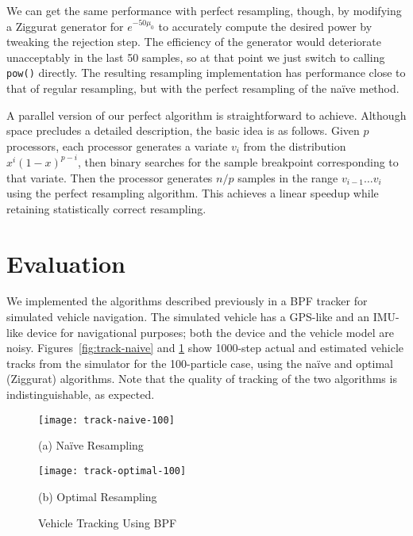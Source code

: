 \documentclass{article}
\begin{document}
  We can get the same performance with perfect resampling,
  though, by modifying a Ziggurat generator for
  $e^{-50\mu_0}$ to accurately compute the desired power by
  tweaking the rejection step.  The efficiency of the
  generator would deteriorate unacceptably in the last 50
  samples, so at that point we just switch to calling {\tt
  pow()} directly.  The resulting resampling implementation
  has performance close to that of regular resampling, but
  with the perfect resampling of the na\"ive method.

  A parallel version of our perfect algorithm is
  straightforward to achieve. Although space precludes a
  detailed description, the basic idea is as follows.  Given
  $p$ processors, each processor generates a variate $v_i$ from the
  distribution $x^i(1-x)^{p-i}$, then binary searches for
  the sample breakpoint corresponding to that variate.  Then
  the processor generates $n/p$ samples in the range
  $v_{i-1}\ldots v_i$ using the perfect resampling
  algorithm.  This achieves a linear speedup while retaining
  statistically correct resampling.

\section{Evaluation}

  We implemented the algorithms described previously in a
  BPF tracker for simulated vehicle navigation.  The
  simulated vehicle has a GPS-like and an IMU-like device
  for navigational purposes; both the device and the vehicle
  model are noisy.  Figures~\ref{fig:track-naive} and
  \ref{fig:track-optimal} show 1000-step actual and estimated vehicle
  tracks from the simulator for the 100-particle case, using
  the na\"ive and optimal (Ziggurat) algorithms.  Note
  that the quality of tracking of the two algorithms is
  indistinguishable, as expected.

  \begin{figure}
    \begin{minipage}{0.45\linewidth}
    \centering
    \texttt{[image: track-naive-100]}
    \begin{center}\small (a) Na\"ive Resampling\label{fig:track-naive}\end{center}
    \end{minipage}
    \begin{minipage}{0.45\linewidth}
    \centering
    \texttt{[image: track-optimal-100]}
    \begin{center}\small (b) Optimal Resampling\label{fig:track-optimal}\end{center}
    \end{minipage}
    \caption{Vehicle Tracking Using BPF}
  \end{figure}
\end{document}
